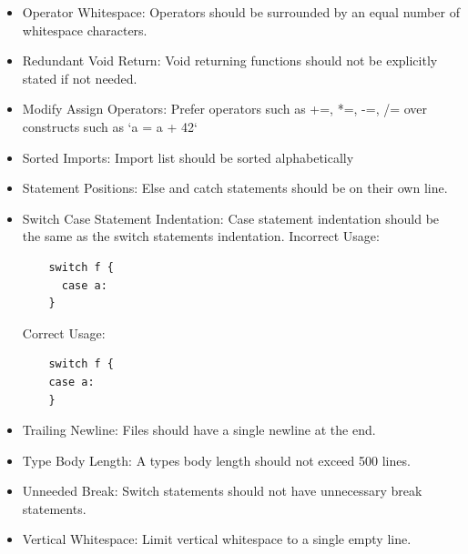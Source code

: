 \documentclass[12pt]{article}
\begin{document}
\begin{itemize}
     \newline
  \item Operator Whitespace:\newline
    Operators should be surrounded by an equal number of whitespace characters. \newline
     \newline
  \item Redundant Void Return:\newline
    Void returning functions should not be explicitly stated if not needed. \newline
     \newline
  \item Modify Assign Operators:\newline
    Prefer operators such as +=, *=, -=, /= over constructs such as `a = a + 42` \newline
     \newline
  \item Sorted Imports:\newline
    Import list should be sorted alphabetically \newline
     \newline
  \item Statement Positions:\newline
    Else and catch statements should be on their own line. \newline
     \newline
  \item Switch Case Statement Indentation:\newline
    Case statement indentation should be the same as the switch statements indentation. \newline
    Incorrect Usage: \newline
    \begin{verbatim}
    switch f {
      case a:
    }
    \end{verbatim}
    Correct Usage: \newline
    \begin{verbatim}
    switch f {
    case a:
    }
    \end{verbatim}
  \item Trailing Newline:\newline
    Files should have a single newline at the end. \newline
     \newline
  \item Type Body Length:\newline
    A types body length should not exceed 500 lines. \newline
     \newline
  \item Unneeded Break:\newline
    Switch statements should not have unnecessary break statements. \newline
     \newline
  \item Vertical Whitespace:\newline
    Limit vertical whitespace to a single empty line. \newline
  \end{itemize} \newpage
\end{document}
